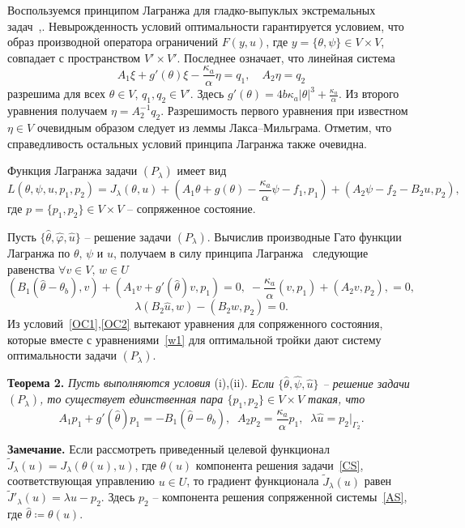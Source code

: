 Воспользуемся принципом
Лагранжа для гладко-выпуклых экстремальных задач~\cite{10},\cite{11}.
Невырожденность условий оптимальности гарантируется условием, что
образ производной
оператора ограничений $F(y, u)$, где $y=\{\theta,\psi\}\in V\times V$,
совпадает с пространством $V'\times V'.$  Последнее означает, что
линейная система
\[
    A_1\xi+g'(\theta)\xi-\frac{\kappa_a}{\alpha}\eta=q_1,\quad
    A_2\eta=q_2
\]
разрешима для всех $\theta\in V$, $q_1,q_2\in V'$.
Здесь $g'(\theta)=4b\kappa_a|\theta|^3+\frac{\kappa_a}{\alpha}$.
Из второго уравнения получаем $\eta=A_2^{-1}q_2$.
Разрешимость первого уравнения при известном $\eta\in V$
очевидным образом следует из леммы Лакса--Мильграма.
Отметим, что справедливость остальных условий принципа Лагранжа также очевидна.

Функция Лагранжа задачи $(P_\lambda)$
имеет вид
\[
    L(\theta, \psi, u, p_1, p_2) = J_\lambda(\theta, u)
    + (A_1\theta+g(\theta)-\frac{\kappa_a}{\alpha}\psi-f_1 ,p_1)+
    (A_2\psi-f_2-B_2u,p_2),
\]
где $p=\{p_1,p_2\}\in V\times V$ -- сопряженное состояние.

Пусть $\{\hat{\theta}, \hat{\varphi}, \hat{u} \}$ -- решение задачи $(P_\lambda)$.
Вычислив производные Гато функции Лагранжа по $\theta,\,\psi$ и $u$, получаем
в силу принципа Лагранжа~\cite[Теорема 1.5]{10} следующие равенства
$\forall v\in V,\, w\in U$
\begin{equation}
    \label{OC1}
    (B_1(\hat{\theta} -\theta_b), v) + (A_1v+g'(\hat{\theta})v,p_1)=0,\;
    -\frac{\kappa_a}{\alpha}(v ,p_1)+
    (A_2v,p_2),    = 0,
\end{equation}
\begin{equation}
    \label{OC2}
    \lambda(B_2\hat{u},w) - (B_2w, p_2) = 0.
\end{equation}
Из условий~\eqref{OC1},\eqref{OC2} вытекают уравнения для сопряженного состояния,
которые вместе с уравнениями~\eqref{w1}
для оптимальной тройки дают систему оптимальности задачи $(P_\lambda)$.

\textbf{Теорема 2.}
\textit{ Пусть выполняются условия} (i),(ii).
\textit{ Если $\{\hat{\theta}, \hat{\psi}, \hat{u}\}$ -- решение
задачи $(P_\lambda)$, то существует единственная пара $\{p_1, p_2 \} \in V\times V$
    такая, что}
\begin{equation}
    \label{AS}
    A_1p_1+g'(\hat{\theta}) p_1=-B_1(\hat{\theta} -\theta_b),\;\;
    A_2p_2=\frac{\kappa_a}{\alpha}p_1,\;\;
    \lambda\hat{u}=p_2|_{\Gamma_2}.
\end{equation}

\textbf{Замечание.} Если рассмотреть приведенный целевой функционал $\tilde J_\lambda(u)=J_\lambda(\theta(u), u)$,
где $\theta(u)$ компонента решения
задачи~\eqref{CS}, соответствующая управлению $u\in U$,
то градиент функционала $\tilde J_\lambda(u)$ равен
$ \tilde J'_\lambda (u) = \lambda u - p_2. $
Здесь $p_2$ -- компонента решения сопряженной системы~\eqref{AS},
где $\hat{\theta}\coloneqq\theta(u)$.


